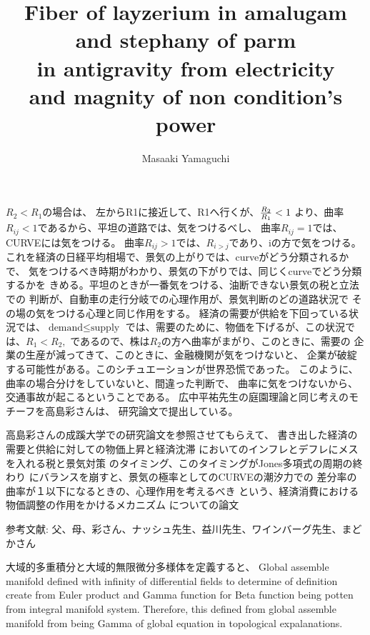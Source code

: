 \documentclass{jsarticle}
\begin{document}
{$ R_2 < R_1 \text{の場合は、}$
左からR1に接近して、R1へ行くが、${R_2 \over R_1} < 1 $
より、曲率$R_{ij} < 1$であるから、平坦の道路では、気をつけるべし、
曲率$R_{ij} = 1$では、CURVEには気をつける。
曲率$R_{ij} > 1$では、$R_{i > j}$であり、iの方で気をつける。
これを経済の日経平均相場で、景気の上がりでは、curveがどう分類されるかで、
気をつけるべき時期がわかり、景気の下がりでは、同じくcurveでどう分類するかを
きめる。平坦のときが一番気をつける、油断できない景気の税と立法での
判断が、自動車の走行分岐での心理作用が、景気判断のどの道路状況で
その場の気をつける心理と同じ作用をする。
経済の需要が供給を下回っている状況では、$\text{demand} \le \text{supply}$
では、需要のために、物価を下げるが、この状況では、$ R_1 < R_2, $
であるので、株は$R_2$の方へ曲率がまがり、このときに、需要の
企業の生産が減ってきて、このときに、金融機関が気をつけないと、
企業が破綻する可能性がある。このシチュエーションが世界恐慌であった。
このように、曲率の場合分けをしていないと、間違った判断で、
曲率に気をつけないから、交通事故が起こるということである。
広中平祐先生の庭園理論と同じ考えのモチーフを高島彩さんは、
研究論文で提出している。

   高島彩さんの成蹊大学での研究論文を参照させてもらえて、
書き出した経済の需要と供給に対しての物価上昇と経済沈滞
においてのインフレとデフレにメスを入れる税と景気対策
のタイミング、このタイミングがJones多項式の周期の終わり
にバランスを崩すと、景気の極率としてのCURVEの潮汐力での
差分率の曲率が１以下になるときの、心理作用を考えるべき
という、経済消費における物価調整の作用をかけるメカニズム
についての論文 　

参考文献: 父、母、彩さん、ナッシュ先生、益川先生、ワインバーグ先生、まどかさん


\title{Fiber of layzerium in amalugam and stephany of parm \\
in antigravity from electricity \\
and magnity of non condition's power}
\author{Masaaki Yamaguchi}

   大域的多重積分と大域的無限微分多様体を定義すると、
   Global assemble manifold defined with infinity of differential
   fields to determine of definition create from Euler product and
   Gamma function for Beta function being potten from integral manifold
   system. Therefore, this defined from global assemble manifold from
   being Gamma of global equation in topological expalanations.

}
\end{document}
